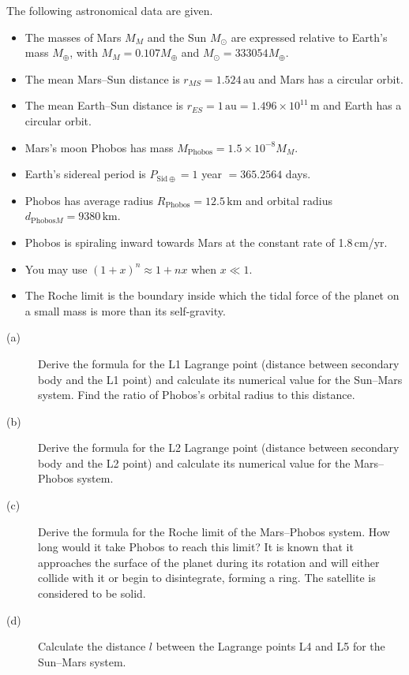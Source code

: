 The following astronomical data are given.
\begin{itemize}
\item The masses of Mars $M_M$ and the Sun $M_\odot$ are expressed relative to Earth's mass $M_\oplus$, with $M_M=0.107M_\oplus$ and $M_\odot=333054M_\oplus$.
\item The mean Mars--Sun distance is $r_{MS}=1.524\,\mathrm{au}$ and Mars has a circular orbit.
\item The mean Earth--Sun distance is $r_{ES}=1\,\mathrm{au}=1.496\times10^{11}\,\mathrm m$ and Earth has a circular orbit.
\item Mars's moon Phobos has mass $M_{\mathrm{Phobos}}=1.5\times10^{-8}M_M$.
\item Earth's sidereal period is $P_{\mathrm{Sid}\oplus}=1$ year $=365.2564$ days.
\item Phobos has average radius $R_{\mathrm{Phobos}}=12.5\,\mathrm{km}$ and orbital radius $d_{\mathrm{Phobos}M}=9380\,\mathrm{km}$.
\item Phobos is spiraling inward towards Mars at the constant rate of 1.8\,cm/yr.
\item You may use $(1+x)^n\approx1+nx$ when $x\ll1$.
\item The Roche limit is the boundary inside which the tidal force of the planet on a small mass is more than its self-gravity.
\end{itemize}
\begin{description}
\item[(a)] Derive the formula for the L1 Lagrange point (distance between secondary body and the L1 point) and calculate its numerical value for the Sun--Mars system. Find the ratio of Phobos's orbital radius to this distance.
\item[(b)] Derive the formula for the L2 Lagrange point (distance between secondary body and the L2 point) and calculate its numerical value for the Mars--Phobos system.
\item[(c)] Derive the formula for the Roche limit of the Mars--Phobos system. How long would it take Phobos to reach this limit? It is known that it approaches the surface of the planet during its rotation and will either collide with it or begin to disintegrate, forming a ring. The satellite is considered to be solid.
\item[(d)] Calculate the distance $l$ between the Lagrange points L4 and L5 for the Sun--Mars system.
\end{description}
